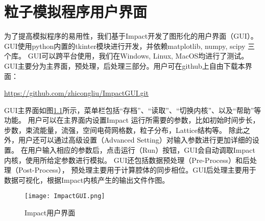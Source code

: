 
\chapter{粒子模拟程序用户界面}

为了提高模拟程序的易用性，我们基于Impact\cite{PIC_ji2000}开发了图形化的用户界面（GUI）。
GUI使用python内置的tkinter模块进行开发，并依赖matplotlib, numpy, scipy 三个库。
GUI可以跨平台使用，我们在Windows, Linux, MacOS均进行了测试。
GUI主要分为主界面，预处理，后处理三部分。用户可在github上自由下载本界面：

\begin{center}
  \href{https://github.com/zhicongliu/ImpactGUI.git}{https://github.com/zhicongliu/ImpactGUI.git}
\end{center}

GUI主界面如图\ref{fig:ImpactGUI}所示，菜单栏包括“存档”、“读取”、“切换内核”、以及“帮助”等功能。
用户可以在主界面内设置Impact 运行所需要的参数，比如初始时间步长，步数，束流能量，流强，空间电荷网格数，粒子分布，Lattice结构等。
除此之外，用户还可以通过高级设置（Advanced Setting）对输入参数进行更加详细的设置。
在用户输入相应的参数后，点击运行（Run）按钮，GUI会自动调取Impact内核，使用所给定参数进行模拟。
GUI还包括数据预处理（Pre-Process）和后处理（Post-Process），
预处理主要用于计算腔体的同步相位。GUI后处理主要用于数据可视化，根据Impact内核产生的输出文件作图。

\begin{figure}
  \centering
  \texttt{[image: ImpactGUI.png]}
  \caption{Impact用户界面}\label{fig:ImpactGUI}
\end{figure}

